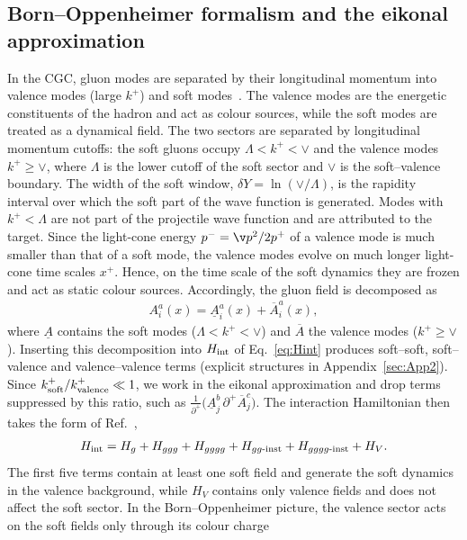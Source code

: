 \subsection{Born--Oppenheimer formalism and the eikonal approximation}\label{subsec:Eikonalapprox}
In the CGC, gluon modes are separated by their longitudinal momentum into valence modes (large
$k^{+}$) and soft modes~\cite{McLerran:1993ni,McLerran:1993ka}. The valence modes are the energetic
constituents of the hadron and act as colour sources, while the soft modes are treated as a dynamical
field. The two sectors are separated by longitudinal momentum cutoffs: the soft gluons occupy
$\Lambda<k^{+}<\vee$ and the valence modes $k^{+}\geq\vee$, where $\Lambda$ is the lower cutoff of the
soft sector and $\vee$ is the soft--valence boundary. The width of the soft window,
$\delta Y=\ln(\vee/\Lambda)$, is the rapidity interval over which the soft part of the wave function
is generated. Modes with $k^{+}<\Lambda$ are not part of the projectile wave function and are
attributed to the target. Since the light-cone energy $p^{-}=\v p^{2}/2p^{+}$ of a valence mode is
much smaller than that of a soft mode, the valence modes evolve on much longer light-cone time
scales $x^{+}$. Hence, on the time scale of the soft dynamics they are frozen and act as static colour
sources. Accordingly, the gluon field is decomposed as
\begin{align}\label{eq:decompose}
A_{i}^{a}(x)=\underline{A}_{i}^{a}(x)+\overline{A}_{i}^{a}(x),
\end{align}
where $\underline{A}$ contains the soft modes ($\Lambda<k^{+}<\vee$) and $\overline{A}$ the valence
modes ($k^{+}\geq\vee$). Inserting this decomposition into $H_{\rm int}$ of Eq.~\eqref{eq:Hint}
produces soft--soft, soft--valence and valence--valence terms (explicit structures in
Appendix~\ref{sec:App2}). Since $k^{+}_{\rm soft}/k^{+}_{\rm valence}\ll1$, we work in the eikonal
approximation and drop terms suppressed by this ratio, such as
$\frac{1}{\partial^{+}}\big(\underline{A}_{j}^{b}\,\partial^{+}\overline{A}_{j}^{c}\big)$. The interaction
Hamiltonian then takes the form of Ref.~\cite{Lublinsky:2016meo},
\begin{align}\label{eq:expandH}
H_{\rm int}=H_{g}+H_{ggg}+H_{gggg}+H_{gg\text{-inst}}+H_{gggg\text{-inst}}+H_{V}.
\end{align}
The first five terms contain at least one soft field and generate the soft dynamics in the valence
background, while $H_{V}$ contains only valence fields and does not affect the soft sector. In the
Born--Oppenheimer picture, the valence sector acts on the soft fields only through its colour charge

